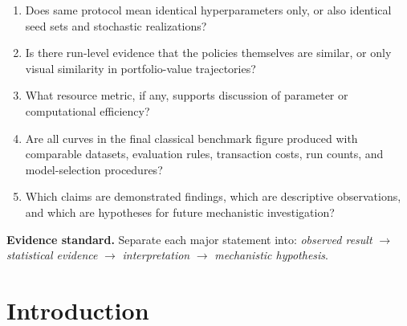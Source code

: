\documentclass[aps,floatfix,superscriptaddress,twocolumn,tightenlines,amsmath,amssymb,nofootinbib,10pt,longbibliography,prl]{revtex4-2}
\begin{document}
\begin{tcolorbox}
\begin{enumerate}
\item Does same protocol mean identical hyperparameters only, or also identical seed sets and stochastic realizations?
\item Is there run-level evidence that the policies themselves are similar, or only visual similarity in portfolio-value trajectories?
\item What resource metric, if any, supports discussion of parameter or computational efficiency?
\item Are all curves in the final classical benchmark figure produced with comparable datasets, evaluation rules, transaction costs, run counts, and model-selection procedures?
\item Which claims are demonstrated findings, which are descriptive observations, and which are hypotheses for future mechanistic investigation?
\end{enumerate}
\textbf{Evidence standard.} Separate each major statement into: \emph{observed result} $\rightarrow$ \emph{statistical evidence} $\rightarrow$ \emph{interpretation} $\rightarrow$ \emph{mechanistic hypothesis}.
\end{tcolorbox}
\twocolumngrid

\section{Introduction}
\label{sec:introduction}
\end{document}
